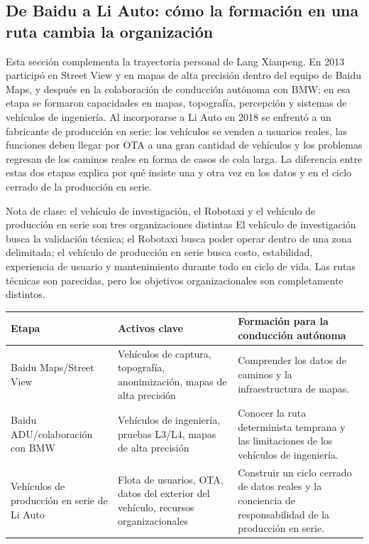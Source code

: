 \documentclass[a4paper]{article}
\begin{document}
\subsection{De Baidu a Li Auto: cómo la formación en una ruta cambia la organización}

Esta sección complementa la trayectoria personal de Lang Xianpeng. En 2013 participó en Street View y en mapas de alta precisión dentro del equipo de Baidu Maps, y después en la colaboración de conducción autónoma con BMW; en esa etapa se formaron capacidades en mapas, topografía, percepción y sistemas de vehículos de ingeniería. Al incorporarse a Li Auto en 2018 se enfrentó a un fabricante de producción en serie: los vehículos se venden a usuarios reales, las funciones deben llegar por OTA a una gran cantidad de vehículos y los problemas regresan de los caminos reales en forma de casos de cola larga. La diferencia entre estas dos etapas explica por qué insiste una y otra vez en los datos y en el ciclo cerrado de la producción en serie.

\begin{knowledgebox}{Nota de clase: el vehículo de investigación, el Robotaxi y el vehículo de producción en serie son tres organizaciones distintas}
El vehículo de investigación busca la validación técnica; el Robotaxi busca poder operar dentro de una zona delimitada; el vehículo de producción en serie busca costo, estabilidad, experiencia de usuario y mantenimiento durante todo su ciclo de vida. Las rutas técnicas son parecidas, pero los objetivos organizacionales son completamente distintos.
\end{knowledgebox}

\noindent\begin{tabularx}{\textwidth}{p{}p{}X}
\toprule
Etapa & Activos clave & Formación para la conducción autónoma \\
\midrule
Baidu Maps/Street View & Vehículos de captura, topografía, anonimización, mapas de alta precisión & Comprender los datos de caminos y la infraestructura de mapas. \\
Baidu ADU/colaboración con BMW & Vehículos de ingeniería, pruebas L3/L4, mapas de alta precisión & Conocer la ruta determinista temprana y las limitaciones de los vehículos de ingeniería. \\
Vehículos de producción en serie de Li Auto & Flota de usuarios, OTA, datos del exterior del vehículo, recursos organizacionales & Construir un ciclo cerrado de datos reales y la conciencia de responsabilidad de la producción en serie. \\
\bottomrule
\end{tabularx}
\end{document}
